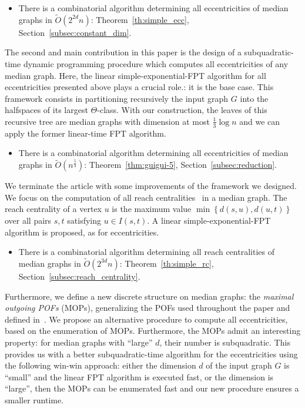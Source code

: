 \documentclass{article}
\newcommand{\set}[1]{\left\{ #1 \right\}}
\begin{document}
\begin{itemize}
\item There is a combinatorial algorithm determining all eccentricities of median graphs in $\tilde{O}(2^{2d}n)$: Theorem~\ref{th:simple_ecc}, Section~\ref{subsec:constant_dim}.
\end{itemize}

The second and main contribution in this paper is the design of a subquadratic-time dynamic programming procedure which computes all eccentricities of any median graph. Here, the linear simple-exponential-FPT algorithm for all eccentricities presented above plays a crucial role.: it is the base case. This framework consists in partitioning recursively the input graph $G$ into the halfspaces of its largest $\Theta$-class. With our construction, the leaves of this recursive tree are median graphs with dimension at most $\frac{1}{3}\log n$ and we can apply the former linear-time FPT algorithm.

\begin{itemize}
    \item There is a combinatorial algorithm determining all eccentricities of median graphs in $\tilde{O}(n^{\frac{5}{3}})$: Theorem~\ref{thm:guigui-5}, Section~\ref{subsec:reduction}.
\end{itemize}

We terminate the article with some improvements of the framework we designed. We focus on the computation of all reach centralities~\cite{Gu04} in a median graph. The reach centrality of a vertex $u$ is the maximum value $\min \set{d(s,u),d(u,t)}$ over all pairs $s,t$ satisfying $u \in I(s,t)$. A linear simple-exponential-FPT algorithm is proposed, as for eccentricities.

\begin{itemize}
    \item There is a combinatorial algorithm determining all reach centralities of median graphs in $\tilde{O}(2^{3d}n)$: Theorem~\ref{th:simple_rc}, Section~\ref{subsec:reach_centrality}.
\end{itemize}

Furthermore, we define a new discrete structure on median graphs: the \textit{maximal outgoing POFs} (MOPs), generalizing the POFs used throughout the paper and defined in~\cite{BeHa21}. We propose an alternative procedure to compute all eccentricities, based on the enumeration of MOPs. Furthermore, the MOPs admit an interesting property: for median graphs with ``large'' $d$, their number is subquadratic. This provides us with a better subquadratic-time algorithm for the eccentricities using the following win-win approach: either the dimension $d$ of the input graph $G$ is ``small'' and the linear FPT algorithm is executed fast, or the dimension is ``large'', then the MOPs can be enumerated fast and our new procedure ensures a smaller runtime.
\end{document}
